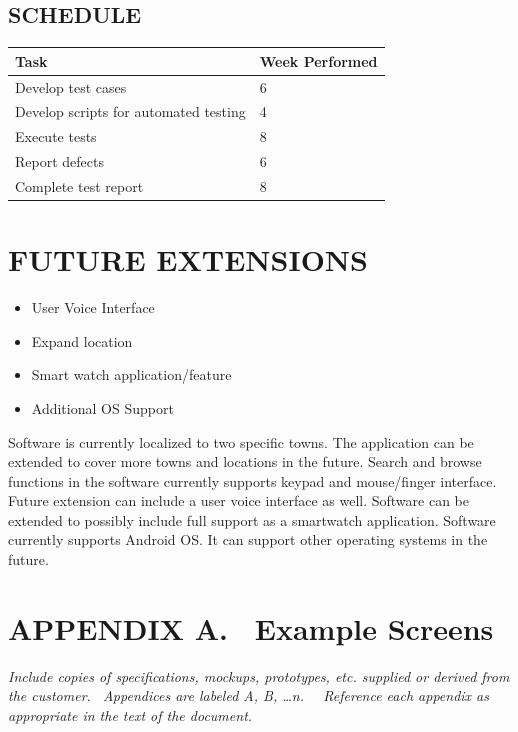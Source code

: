 \documentclass[twoside,letterpaper]{article}
\begin{document}
\subsection{SCHEDULE}
{\rmfamily\color{black}
\begin{center}
\begin{tabular}{ | M{5cm} | M{5cm}| } 
\hline
\textbf{Task} & \textbf{Week Performed}\\ 
\hline
Develop test cases & 6 \\ 
\hline
Develop scripts for automated testing & 4 \\ 
\hline
Execute tests & 8 \\ 
\hline
Report defects & 6 \\ 
\hline
Complete test report & 8 \\ 
\hline
\end{tabular}
\end{center}
}

\clearpage\section{FUTURE EXTENSIONS}
\begin{itemize}
\item{User Voice Interface}
\item{Expand location}
\item{Smart watch application/feature}
\item{Additional OS Support}
\end{itemize}
{\rmfamily\color{black}
Software is currently localized to two specific towns.  The application can be extended to cover more towns and locations in the future.
Search and browse functions in the software currently supports keypad and mouse/finger interface.  Future extension can include a user voice interface as well. 
Software can be extended to possibly include full support as a smartwatch application. 
Software currently supports Android OS.  It can support other operating systems in the future.}

\clearpage\section[APPENDIX A. \ Example Screens]{\rmfamily\bfseries\color{black}
APPENDIX A. \ Example Screens}

\bigskip

{\itshape\color{black}
Include copies of specifications, mockups, prototypes, etc. supplied or
derived from the customer. \ Appendices are labeled A, B, {\dots}n.
\ \ Reference each appendix as appropriate in the text of the document.
}
\end{document}
